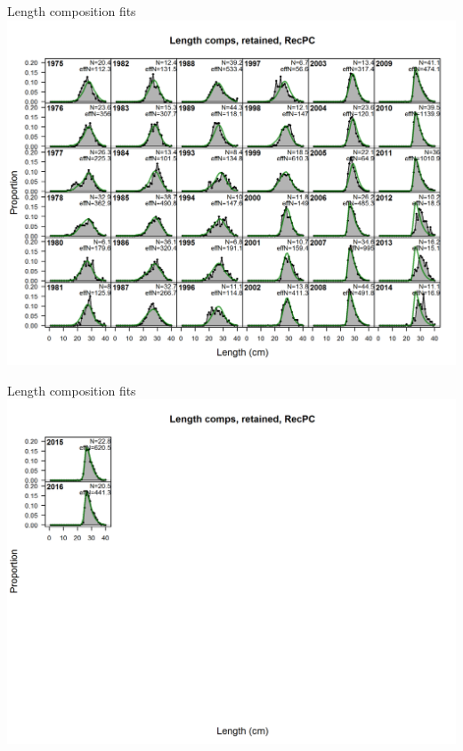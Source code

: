 \documentclass[ignorenonframetext,]{beamer}
\begin{document}
\begin{frame}{Length composition fits}\includegraphics{./r4ss/plots_mod1/comp_lenfit_flt5mkt2_page1.png}\end{frame}

\begin{frame}{Length composition fits}\includegraphics{./r4ss/plots_mod1/comp_lenfit_flt5mkt2_page2.png}\end{frame}
\end{document}
